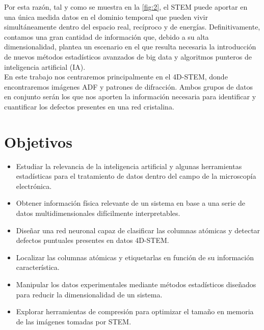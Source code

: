 Por esta razón, tal y como se muestra en la \autoref{fig:2}, el STEM puede aportar en una única medida datos en el dominio temporal que pueden vivir simultáneamente dentro del espacio real, recíproco y de energías. Definitivamente, contamos una gran cantidad de información que, debido a su alta dimensionalidad, plantea un escenario en el que resulta necesaria la introducción de nuevos métodos estadísticos avanzados de big data y algoritmos punteros de inteligencia artificial (IA).\\


En este trabajo nos centraremos principalmente en el 4D-STEM, donde encontraremos imágenes ADF y patrones de difracción. Ambos grupos de datos en conjunto serán los que nos aporten la información necesaria para identificar y cuantificar los defectos presentes en una red cristalina.\\

\section*{Objetivos}
 \normalsize

\begin{itemize}
    \item Estudiar la relevancia de la inteligencia artificial y algunas herramientas estadísticas para el tratamiento de datos dentro del campo de la microscopía electrónica. %
    
    \item Obtener información física relevante de un sistema en base a una serie de datos multidimensionales difícilmente interpretables. %
    
    \item Diseñar una red neuronal capaz de clasificar las columnas atómicas y detectar defectos puntuales presentes en datos 4D-STEM. %

    \item Localizar las columnas atómicas y etiquetarlas en función de su información característica. %
    
    \item Manipular los datos experimentales mediante métodos estadísticos diseñados para reducir la dimensionalidad de un sistema. %
    
    \item Explorar herramientas de compresión para optimizar el tamaño en memoria de las imágenes tomadas por STEM. %
\end{itemize}
